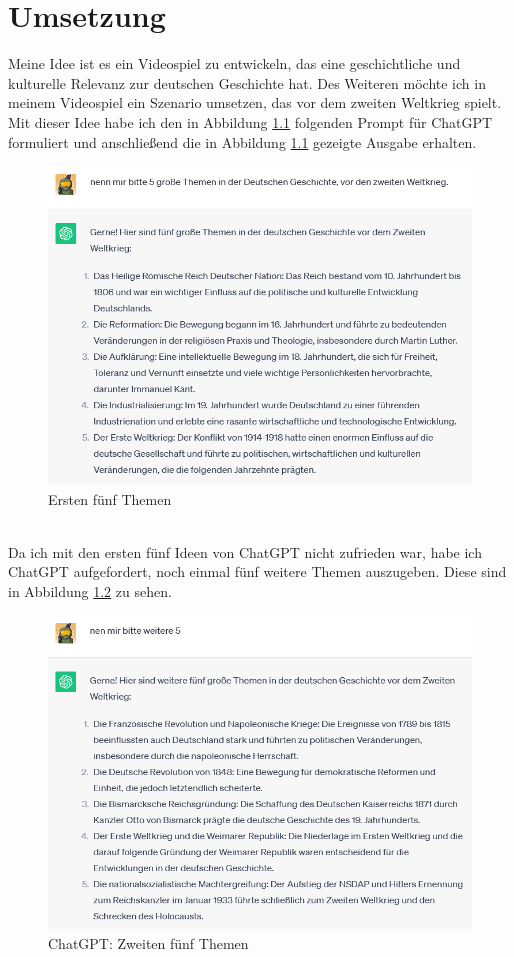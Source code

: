\chapter{Umsetzung}
Meine Idee ist es ein Videospiel zu entwickeln, das eine geschichtliche und kulturelle Relevanz zur deutschen Geschichte hat. Des Weiteren möchte ich in meinem Videospiel ein Szenario umsetzen, das vor dem zweiten Weltkrieg spielt. Mit dieser Idee habe ich den in Abbildung \ref{ersten-5-themen} folgenden Prompt für ChatGPT formuliert und anschließend die in Abbildung \ref{ersten-5-themen} gezeigte Ausgabe erhalten.
\begin{figure}[hbt]
	\centering
	\includegraphics[width=14cm]{BilderFuerBA/thema01.png}
	\caption{Ersten fünf Themen}
	\label{ersten-5-themen}
\end{figure}
\\
Da ich mit den ersten fünf Ideen von ChatGPT nicht zufrieden war, habe ich ChatGPT aufgefordert, noch einmal fünf weitere Themen auszugeben. Diese sind in Abbildung \ref{zweiten-5-themen} zu sehen.
\begin{figure}[hbt]
	\centering
	\includegraphics[width=14cm]{BilderFuerBA/thema02.png}
	\caption{ChatGPT: Zweiten fünf Themen}
	\label{zweiten-5-themen}
\end{figure}
